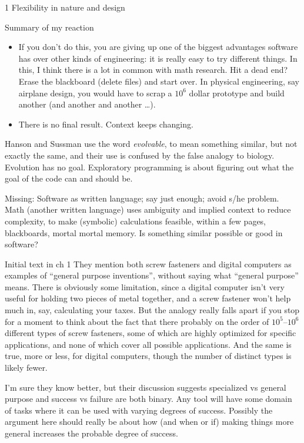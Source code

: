 \documentclass[12pt]{PalisadesLakesBook}
\begin{document}
\begin{plSection}{}
\begin{plSection}{1 Flexibility in nature and design}
\begin{plSection}{Summary of my reaction}
\begin{itemize}
  \item If you don't do this, you are giving up one of the
  biggest advantages software has over other kinds of engineering:
  it is really easy to try different things.
  In this, I think there is a lot in common with math research.
  Hit a dead end? Erase the blackboard (delete files) 
  and start over.
  In physical engineering, say airplane design, you would have
  to scrap a $10^{6}$ dollar prototype and build another
  (and another and another {\ldots}).
  
  \item There is no final result. Context keeps changing.
  
\end{itemize}
Hanson and Sussman use the word \emph{evolvable}, 
to mean something similar, but not exactly the same,
and their use is confused by the false analogy to biology.
Evolution has no goal. 
Exploratory programming is about figuring out what the goal 
of the code can and should be.

Missing:
Software as written language; 
say just enough; avoid s/he problem.
Math (another written language) uses ambiguity
and implied context to reduce complexity,
to make (symbolic) calculations feasible,
within a few pages, blackboards, mortal mortal memory.
Is something similar possible or good in software? 

\end{plSection}%
\begin{plSection}{Initial text in ch 1}
They mention both screw fasteners and digital computers
as examples  of ``general purpose inventions'',
without saying what ``general purpose'' means.
There is obviously some limitation,
since a digital computer isn't very useful for holding two pieces 
of metal together, and a screw fastener won't help much in, say,
calculating your taxes. 
But the analogy really falls apart if you stop for a moment to
think about the fact that there probably on the order of 
$10^{5}\text{--}10^{6}$ different types of screw fasteners,
some  of which are highly optimized for specific applications,
and none of which cover all possible applications.
And the same is true, more or less, for digital computers,
though the number of distinct types is likely fewer.

I'm sure they know better, 
but their discussion suggests
specialized vs general purpose
and success vs failure are both binary.
Any tool will have some domain of tasks where it can be used
with varying degrees of success.
Possibly the argument here should really be about 
how (and when or if) making things more general increases
the probable degree of success. 


\end{plSection}
\end{plSection}
\end{plSection}
\end{document}
